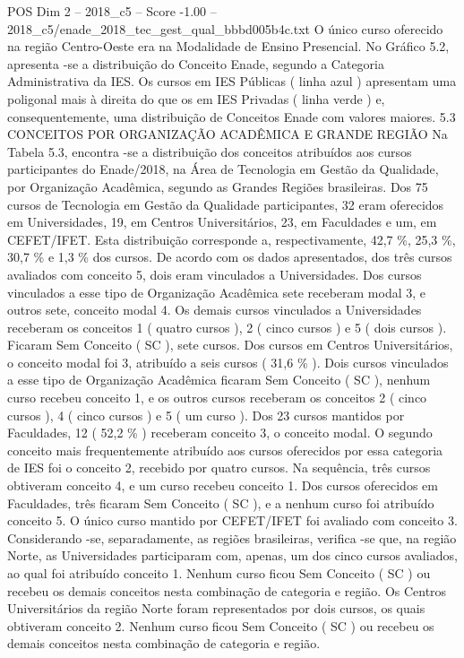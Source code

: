 \begin{textsample}{POS Dim 2 – 2018\_c5 – Score -1.00 – 2018\_c5/enade\_2018\_tec\_gest\_qual\_bbbd005b4c.txt}
O único curso oferecido na região Centro-Oeste era na Modalidade de Ensino Presencial.
No Gráfico 5.2, apresenta -se a distribuição do Conceito Enade, segundo a Categoria Administrativa da IES.
Os cursos em IES Públicas ( linha azul ) apresentam uma poligonal mais à direita do que os em IES Privadas ( linha verde ) e, consequentemente, uma distribuição de Conceitos Enade com valores maiores. 5.3 CONCEITOS POR ORGANIZAÇÃO ACADÊMICA E GRANDE REGIÃO Na Tabela 5.3, encontra -se a distribuição dos conceitos atribuídos aos cursos participantes do Enade/2018, na Área de Tecnologia em Gestão da Qualidade, por Organização Acadêmica, segundo as Grandes Regiões brasileiras.
Dos 75 cursos de Tecnologia em Gestão da Qualidade participantes, 32 eram oferecidos em Universidades, 19, em Centros Universitários, 23, em Faculdades e um, em CEFET/IFET.
Esta distribuição corresponde a, respectivamente, 42,7 \%, 25,3 \%, 30,7 \% e 1,3 \% dos cursos.
De acordo com os dados apresentados, dos três cursos avaliados com conceito 5, dois eram vinculados a Universidades.
Dos cursos vinculados a esse tipo de Organização Acadêmica sete receberam modal 3, e outros sete, conceito modal 4.
Os demais cursos vinculados a Universidades receberam os conceitos 1 ( quatro cursos ), 2 ( cinco cursos ) e 5 ( dois cursos ).
Ficaram Sem Conceito ( SC ), sete cursos.
Dos cursos em Centros Universitários, o conceito modal foi 3, atribuído a seis cursos ( 31,6 \% ).
Dois cursos vinculados a esse tipo de Organização Acadêmica ficaram Sem Conceito ( SC ), nenhum curso recebeu conceito 1, e os outros cursos receberam os conceitos 2 ( cinco cursos ), 4 ( cinco cursos ) e 5 ( um curso ).
Dos 23 cursos mantidos por Faculdades, 12 ( 52,2 \% ) receberam conceito 3, o conceito modal.
O segundo conceito mais frequentemente atribuído aos cursos oferecidos por essa categoria de IES foi o conceito 2, recebido por quatro cursos.
Na sequência, três cursos obtiveram conceito 4, e um curso recebeu conceito 1.
Dos cursos oferecidos em Faculdades, três ficaram Sem Conceito ( SC ), e a nenhum curso foi atribuído conceito 5.
O único curso mantido por CEFET/IFET foi avaliado com conceito 3.
Considerando -se, separadamente, as regiões brasileiras, verifica -se que, na região Norte, as Universidades participaram com, apenas, um dos cinco cursos avaliados, ao qual foi atribuído conceito 1.
Nenhum curso ficou Sem Conceito ( SC ) ou recebeu os demais conceitos nesta combinação de categoria e região.
Os Centros Universitários da região Norte foram representados por dois cursos, os quais obtiveram conceito 2.
Nenhum curso ficou Sem Conceito ( SC ) ou recebeu os demais conceitos nesta combinação de categoria e região.

\end{textsample}
